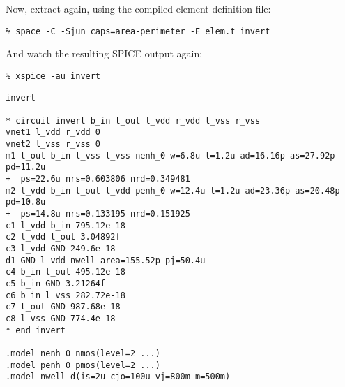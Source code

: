 \normalsize
Now, extract again, using the compiled element definition file:
\small
\begin{Verbatim}
% space -C -Sjun_caps=area-perimeter -E elem.t invert
\end{Verbatim}
\normalsize
And watch the resulting SPICE output again:
\small
\begin{Verbatim}
% xspice -au invert
\end{Verbatim}
\normalsize
\small \begin{Verbatim}[frame=single]
invert

* circuit invert b_in t_out l_vdd r_vdd l_vss r_vss
vnet1 l_vdd r_vdd 0
vnet2 l_vss r_vss 0
m1 t_out b_in l_vss l_vss nenh_0 w=6.8u l=1.2u ad=16.16p as=27.92p pd=11.2u
+  ps=22.6u nrs=0.603806 nrd=0.349481
m2 l_vdd b_in t_out l_vdd penh_0 w=12.4u l=1.2u ad=23.36p as=20.48p pd=10.8u
+  ps=14.8u nrs=0.133195 nrd=0.151925
c1 l_vdd b_in 795.12e-18
c2 l_vdd t_out 3.04892f
c3 l_vdd GND 249.6e-18
d1 GND l_vdd nwell area=155.52p pj=50.4u
c4 b_in t_out 495.12e-18
c5 b_in GND 3.21264f
c6 b_in l_vss 282.72e-18
c7 t_out GND 987.68e-18
c8 l_vss GND 774.4e-18
* end invert

.model nenh_0 nmos(level=2 ...)
.model penh_0 pmos(level=2 ...)
.model nwell d(is=2u cjo=100u vj=800m m=500m)
\end{Verbatim}
\normalsize
